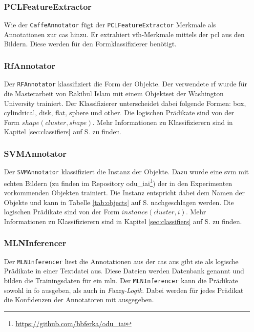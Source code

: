 \subsubsection{PCLFeatureExtractor}
Wie der \texttt{CaffeAnnotator} fügt der \texttt{PCLFeatureExtractor} Merkmale als Annotationen zur \gls{cas} hinzu. Er extrahiert \gls{vfh}-Merkmale mittels der \gls{pcl} aus den Bildern. Diese werden für den Formklassifizierer benötigt.

\subsubsection{RfAnnotator}
Der \texttt{RFAnnotator} klassifiziert die Form der Objekte. Der verwendete \gls{rf} wurde für die Masterarbeit von Rakibul Islam \cite{rakib} mit einem Objektset der Washington University trainiert. Der Klassifizierer unterscheidet dabei folgende Formen: box, cylindrical, disk, flat, sphere und other. Die logischen Prädikate sind von der Form  $shape(cluster, shape)$. Mehr Informationen zu Klassifizierern sind in Kapitel \ref{sec:classifiers} auf S. \pageref{sec:classifiers} zu finden.

\subsubsection{SVMAnnotator}
Der \texttt{SVMAnnotator} klassifiziert die Instanz der Objekte. Dazu wurde eine \gls{svm} mit echten Bildern (zu finden im Repository odu\_iai\footnote{\url{https://github.com/bbferka/odu\_iai}}) der in den Experimenten vorkommenden Objekten trainiert. Die Instanz entspricht dabei dem Namen der Objekte und kann in Tabelle \ref{tab:objects} auf S.\pageref{tab:objects} nachgeschlagen werden. Die logischen Prädikate sind von der Form  $instance(cluster, i)$. Mehr Informationen zu Klassifizierern sind in Kapitel \ref{sec:classifiers} auf S. \pageref{sec:classifiers} zu finden.

\subsubsection{MLNInferencer}
\label{sec:mlnInferencer}
Der \texttt{MLNInferencer} liest die Annotationen aus der \gls{cas} aus gibt sie als logische Prädikate in einer Textdatei aus. Diese Dateien werden Datenbank genannt und bilden die Trainingsdaten für ein \gls{mln}. Der \texttt{MLNInferencer} kann die Prädikate sowohl in \gls{fo} ausgeben, als auch in \textit{Fuzzy-Logik}. Dabei werden für jedes Prädikat die Konfidenzen der Annotatoren mit ausgegeben.



